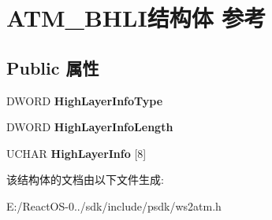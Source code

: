 \hypertarget{struct_a_t_m___b_h_l_i}{}\section{A\+T\+M\+\_\+\+B\+H\+L\+I结构体 参考}
\label{struct_a_t_m___b_h_l_i}
\subsection*{Public 属性}
\begin{DoxyCompactItemize}
\item 
\mbox{\label{struct_a_t_m___b_h_l_i_aa1c43c003a16c77be52dd77a358b358e}} 
D\+W\+O\+RD {\bfseries High\+Layer\+Info\+Type}
\item 
\mbox{\label{struct_a_t_m___b_h_l_i_a8b76f7ac4f4b12adf84115418929033d}} 
D\+W\+O\+RD {\bfseries High\+Layer\+Info\+Length}
\item 
\mbox{\label{struct_a_t_m___b_h_l_i_ab5a1b345543cca926c9c0f8bf9f8c8e9}} 
U\+C\+H\+AR {\bfseries High\+Layer\+Info} \mbox{[}8\mbox{]}
\end{DoxyCompactItemize}


该结构体的文档由以下文件生成\+:\begin{DoxyCompactItemize}
\item 
E\+:/\+React\+O\+S-\/0../sdk/include/psdk/ws2atm.\+h\end{DoxyCompactItemize}
